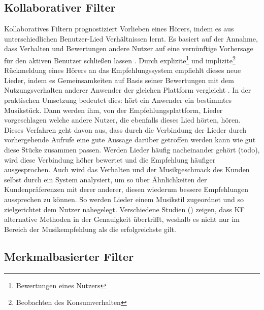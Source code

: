 \documentclass[twosided,a4,10pt]{article}
\begin{document}
\begin{multicols}{2}
		\subsection{Kollaborativer Filter}
		Kollaboratives Filtern prognostiziert Vorlieben eines Hörers, indem es aus unterschiedlichen Benutzer-Lied Verhältnissen lernt. Es basiert auf der Annahme, dass Verhalten und Bewertungen andere Nutzer auf eine vernünftige Vorhersage für den aktiven Benutzer schließen lassen \cite{celma}. Durch explizite\footnote[4]{ Bewertungen eines Nutzers} und implizite\footnote[5]{Beobachten des Konsumverhalten} Rückmeldung eines Hörers an das Empfehlungssystem empfiehlt dieses neue Lieder, indem es Gemeinsamkeiten auf Basis seiner Bewertungen mit dem Nutzungsverhalten anderer Anwender der gleichen Plattform vergleicht \cite{mcfee}.\newline
		In der praktischen Umsetzung bedeutet dies: hört ein Anwender ein bestimmtes Musikstück. Dann werden ihm, von der Empfehlungsplattform, Lieder vorgeschlagen welche andere Nutzer, die ebenfalls dieses Lied hörten, hören. Dieses Verfahren geht davon aus, dass durch die Verbindung der Lieder durch vorhergehende Aufrufe eine gute Aussage darüber getroffen werden kann wie gut diese Stücke zusammen passen. Werden Lieder häufig nacheinander gehört (todo), wird diese Verbindung höher bewertet und die Empfehlung häufiger ausgesprochen. Auch wird das Verhalten und der Musikgeschmack des Kunden selbst durch ein System analysiert, um so über Ähnlichkeiten der Kundenpräferenzen mit derer anderer, diesen wiederum bessere Empfehlungen aussprechen zu können. So werden Lieder einem Musikstil zugeordnet und so zielgerichtet dem Nutzer nahegelegt.\newline
		Verschiedene Studien (\cite{mcfee}\cite{barrington}) zeigen, dass KF alternative Methoden in der Genauigkeit übertrifft, weshalb es nicht nur im Bereich der Musikempfehlung als die erfolgreichste gilt.\newline
		\subsection{Merkmalbasierter Filter}

\end{multicols}
\end{document}
